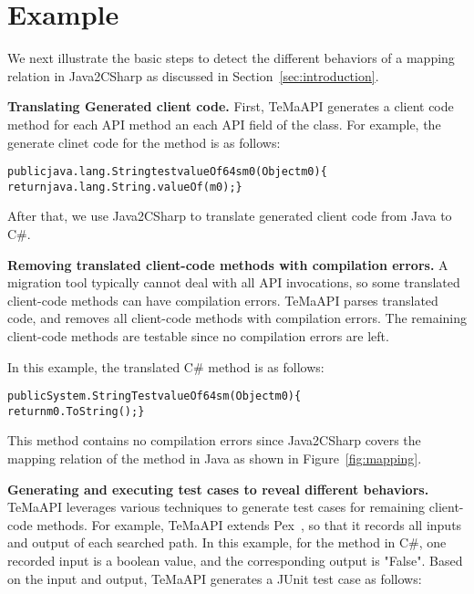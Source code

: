 \section{Example}
\label{sec:example}

We next illustrate the basic steps to detect the different behaviors of a mapping relation in Java2CSharp as discussed in Section~\ref{sec:introduction}.

\textbf{Translating Generated client code.} First, TeMaAPI generates a client code method for each API method an each API field of the  class. For example, the generate clinet code for the  method is as follows:

\begin{CodeOut}%
\begin{alltt}
  public java.lang.String testvalueOf64sm0(Object m0)\{
    return java.lang.String.valueOf(m0);\}
\end{alltt}
\end{CodeOut}


After that, we use Java2CSharp to translate generated client code from Java to C\#.

\textbf{Removing translated client-code methods with compilation errors.} A migration tool typically cannot deal with all API invocations, so some translated client-code methods can have compilation errors. TeMaAPI parses translated code, and removes all client-code methods with compilation errors. The remaining client-code methods are testable since no compilation errors are left.

In this example, the translated C\#  method is as follows:
\begin{CodeOut}%
\begin{alltt}
  public System.String TestvalueOf64sm(Object m0) \{
    return m0.ToString();\}
\end{alltt}
\end{CodeOut}

This method contains no compilation errors since Java2CSharp covers the mapping relation of the method in Java as shown in Figure~\ref{fig:mapping}.

\textbf{Generating and executing test cases to reveal different behaviors.} TeMaAPI leverages various techniques to generate test cases for remaining client-code methods. For example, TeMaAPI extends Pex~\cite{tillmann2008pex}, so that it records all inputs and output of each searched path. In this example, for the  method in C\#, one recorded input is a boolean value, and the corresponding output is "False". Based on the input and output, TeMaAPI generates a JUnit test case as follows:

